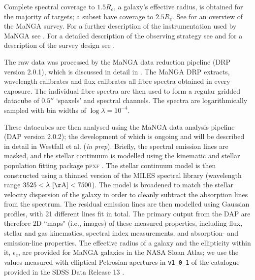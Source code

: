 \documentclass[useAMS,usenatbib]{mn2e}
\def\refcol		{\color{refcol}}
\def\minor		{\color{minorcol}}
\begin{document}
Complete spectral coverage to $1.5 R_e$, a galaxy's effective radius, is obtained for the majority of targets; a subset have coverage to $2.5 R_e$. See \cite{bundy15} for an overview of the MaNGA survey. For a further description of the instrumentation used by MaNGA see \cite{drory15}. For a detailed description of the observing strategy see \cite{law15} and for a description of the survey design see \cite{yan16}. %

The raw data was processed by the MaNGA data reduction pipeline (DRP version 2.0.1), which is discussed in detail in \cite{law16}. The MaNGA DRP extracts, wavelength calibrates and flux calibrates all fibre spectra obtained in every exposure. The individual fibre spectra are then used to form a regular gridded datacube of $0.5''$ ‘spaxels’ and spectral channels. The spectra are logarithmically sampled with bin widths of $\log{\lambda} = 10^{-4}$. 

These datacubes are then analysed using the MaNGA data analysis pipeline (DAP version 2.0.2); the development of which is ongoing and will be described in detail in {\refcol Westfall et al. (\emph{in prep})}. {\minor Briefly, the spectral emission lines are masked, and the stellar continuum is modelled using the kinematic and stellar population fitting package p\textsc{pxf} \citep{cappellari04}. The stellar continuum model is then constructed using a thinned version of the MILES spectral library (wavelength range $3525 < \lambda~[\rm{\AA}] < 7500$). The model is broadened to match the stellar velocity dispersion of the galaxy in order to cleanly subtract the absorption lines from the spectrum. The residual emission lines are then modelled using Gaussian profiles, with 21 different lines fit in total.} The primary output from the DAP are therefore 2D ``maps" (i.e., images) of these measured properties, including flux, stellar and gas kinematics, spectral index measurements, and absorption- and emission-line properties. The effective radius of a galaxy and the ellipticity within it, $\epsilon_e$, are provided for MaNGA galaxies in the NASA Sloan Atlas; we use the values measured with elliptical Petrosian apertures in {\tt v1\_0\_1} of the catalogue provided in the SDSS Data Release 13 \citep{albareti16}. 
\end{document}
